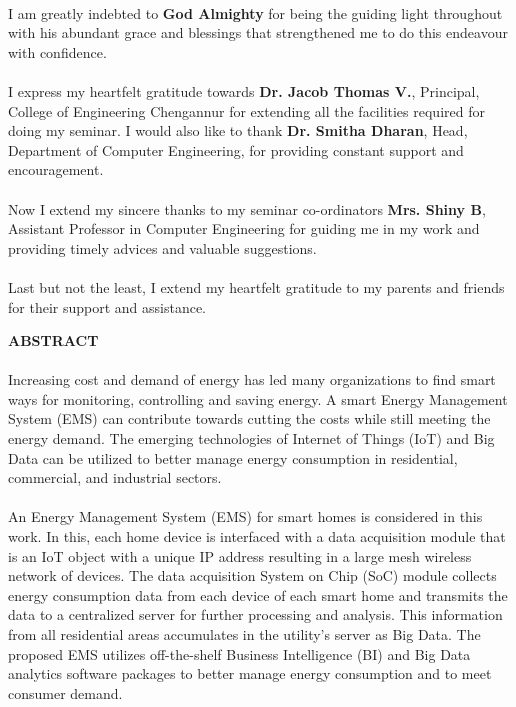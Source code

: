 \documentclass[a4paper,12pt,oneside]{article}
\begin{document}
\paragraph{}
I am greatly indebted to \textbf{God Almighty} for being the guiding light throughout with his
abundant grace and blessings that strengthened me to do this endeavour with confidence.
\paragraph{}
I express my heartfelt gratitude towards \textbf{Dr. Jacob Thomas V.}, Principal, College
of Engineering Chengannur for extending all the facilities required for doing my seminar.
I would also like to thank \textbf{Dr. Smitha Dharan}, Head, Department of Computer
Engineering, for providing constant support and encouragement.
\paragraph{}
Now I extend my sincere thanks to my seminar co-ordinators \textbf{Mrs. Shiny B}, Assistant
Professor in Computer Engineering for guiding me in my work and providing timely
advices and valuable suggestions.
\paragraph{}
Last but not the least, I extend my heartfelt gratitude to my parents and friends for
their support and assistance.	

\newpage
\begin{center}
\large{\textbf{ABSTRACT}}
\end{center}
\vspace{4ex}
\paragraph{}
Increasing cost and demand of energy has led many
organizations to find smart ways for monitoring, controlling and
saving energy. A smart Energy Management System (EMS) can
contribute towards cutting the costs while still meeting the energy
demand. The emerging technologies of Internet of Things (IoT)
and Big Data can be utilized to better manage energy
consumption in residential, commercial, and industrial sectors.
\paragraph{}
An Energy Management System (EMS) for smart homes is considered in this work. In this, each home device is interfaced with
a data acquisition module that is an IoT object with a unique IP
address resulting in a large mesh wireless network of devices.
The data acquisition System on Chip (SoC) module collects
energy consumption data from each device of each smart home
and transmits the data to a centralized server for further
processing and analysis. This information from all residential
areas accumulates in the utility’s server as Big Data. The
proposed EMS utilizes off-the-shelf Business Intelligence (BI) and
Big Data analytics software packages to better manage energy
consumption and to meet consumer demand.
\setlength{\baselineskip}{1.0\baselineskip}
\end{document}
